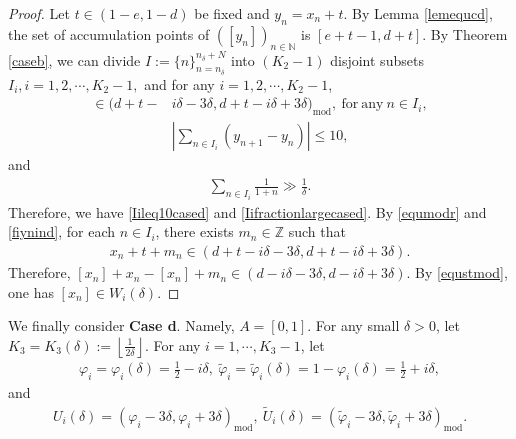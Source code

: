 \documentclass[12pt]{amsart}
\newcommand{\abs}[1]{\left\lvert #1 \right\rvert}
\theoremstyle{plain}
\newcommand{\Z}{\mathbb{Z}}
\theoremstyle{definition}
\begin{document}
\begin{proof}
	Let $t\in (1-e,1-d)$ be fixed and $y_n=x_n+t$. By Lemma \ref{lemequcd}, the set of accumulation points of $([y_n])_{n\in\mathbb{N}}$ is $[e+t-1,d+t]$. By Theorem \ref{caseb}, we can divide $I:=\{n\}_{n=n_\delta}^{n_\delta+N}$ into $(K_2-1)$ disjoint subsets $I_i, i=1,2,\cdots,K_2-1,$  and for any $i=1,2,\cdots,K_2-1$,
	\begin{align}
		[y_n]\in (d+t-&i\delta-3\delta,d+t-i\delta+3\delta)_{\mathrm{mod}},\ \mathrm{for\ any}\ n\in I_i,\label{fiynind}\\
		&\abs{\sum_{n\in I_i}(y_{n+1}-y_n)}\leq 10,\nonumber
	\end{align}
	and 
	\begin{align}
		\sum_{n\in I_i}\frac{1}{1+n}\gg \frac{1}{\delta}.\nonumber
	\end{align}
	Therefore, we have \eqref{Iileq10cased} and \eqref{Iifractionlargecased}. 
	By \eqref{equmodr} and \eqref{fiynind}, for each $n\in I_i$, there exists $m_n\in\Z$ such that
	\begin{align}
		x_n+t+m_n\in(d+t-i\delta-3\delta,d+t-i\delta+3\delta).\nonumber
	\end{align}
	Therefore, $[x_n]+x_n-[x_n]+m_n\in (d-i\delta-3\delta,d-i\delta+3\delta)$. By \eqref{equstmod}, one has $[x_n]\in W_i(\delta)$.
\end{proof}
We finally consider \textbf{Case d}. Namely, $A=[0,1]$. For any small $\delta>0$, let $K_3=K_3(\delta):=\left \lfloor \frac{1}{2\delta} \right \rfloor$. For any $i=1,\cdots,K_3-1$, let
\begin{align}
	\varphi_i=\varphi_i(\delta)=\frac{1}{2}-i\delta, \ \tilde{\varphi}_i=\tilde{\varphi}_i(\delta)=1-\varphi_i(\delta)=\frac{1}{2}+i\delta,\label{definitionofthetai}
\end{align}
and
\begin{align}
	U_i(\delta)=(\varphi_i-3\delta,\varphi_i+3\delta)_{\mathrm{mod}},\ \tilde{U}_i(\delta)=(\tilde{\varphi}_i-3\delta,\tilde{\varphi}_i+3\delta)_{\mathrm{mod}}.\label{definitionofui}
\end{align}
\end{document}

